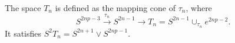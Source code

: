 The space $T_n$ is defined as the mapping cone of $\tau_n$, where
\[
S^{2np-3} \xrightarrow{\tau_n} S^{2n-1} \to T_n = S^{2n-1} \cup_{\tau_n} e^{2np-2}.
\]
It satisfies $S^2 T_n = S^{2n+1} \vee S^{2np-1}$.
